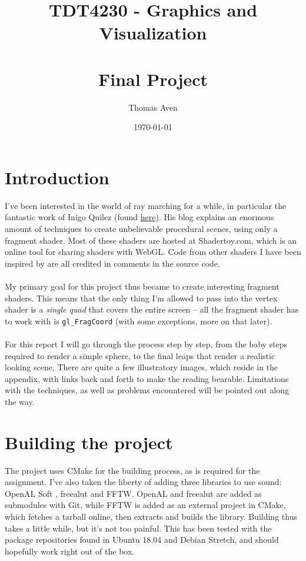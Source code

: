 \documentclass[abstract=off,oneside]{scrreprt}
\author{Thomas Aven}
\date{\today}
\title{TDT4230 - Graphics and Visualization \large \\~\\ Final Project}
\begin{document}
\maketitle

\section*{Introduction}
\label{sec-1}
I've been interested in the world of ray marching for a while, in
particular the fantastic work of Inigo Quilez (found \href{https://iquilezles.org/www/index.htm}{here}). His blog
explains an enormous amount of techniques to create unbelievable
procedural scenes, using only a fragment shader. Most of these shaders
are hosted at Shadertoy.com, which is an online tool for sharing
shaders with WebGL. Code from other shaders I have been inspired by
are all credited in comments in the source code.
\\\\
My primary goal for this project thus became to create interesting
fragment shaders. This means that the only thing I'm allowed to pass
into the vertex shader is a \emph{single quad} that covers the
entire screen -- all the fragment shader has to work with is
\verb~gl_FragCoord~ (with some exceptions, more on that later).
\\\\
For this report I will go through the process step by step, from the
baby steps required to render a simple sphere, to the final leaps that
render a realistic looking scene. There are quite a few illustratory
images, which reside in the appendix, with links back and forth to
make the reading bearable. Limitations with the techniques, as well as
problems encountered will be pointed out along the way.

\section*{Building the project}
\label{sec-2}
The project uses CMake for the building process, as is required for
the assignment. I've also taken the liberty of adding three libraries
to use sound: OpenAL Soft , freealut and FFTW. OpenAL and freealut are
added as submodules with Git, while FFTW is added as an external
project in CMake, which fetches a tarball online, then extracts and
builds the library. Building thus takes a little while, but it's not
too painful. This has been tested with the package repositories found
in Ubuntu 18.04 and Debian Stretch, and should hopefully work right
out of the box.
\end{document}
